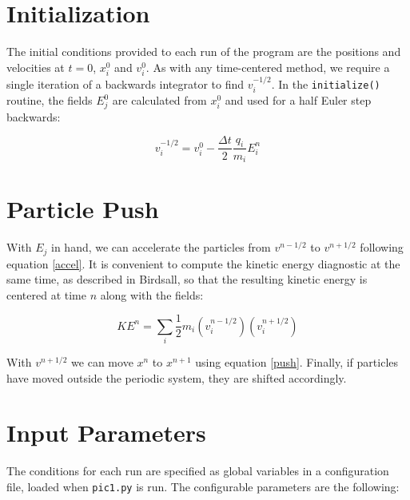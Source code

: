 \documentclass[%
 reprint,
 amsmath,amssymb,
 aps,
]{revtex4-2}
\begin{document}
\section{Initialization}

The initial conditions provided to each run of the program are the positions and velocities at $t=0$, $x_i ^0$ and $v_i ^0$. As with any time-centered method, we require a single iteration of a backwards integrator to find $v_i ^{-1/2}$. In the \texttt{initialize()} routine, the fields $E_j ^0$ are calculated from $x_i ^0$ and used for a half Euler step backwards:

\begin{equation}
v _i ^{-1/2} = v_i ^0 - \frac{\Delta t}{2} \frac{q_i}{m_i} E_i ^n
\end{equation}

\section{Particle Push}

With $E_j$ in hand, we can accelerate the particles from $v^{n - 1/2}$ to $v^{n + 1/2}$ following equation \eqref{accel}. It is convenient to compute the kinetic energy diagnostic at the same time, as described in Birdsall, so that the resulting kinetic energy is centered at time $n$ along with the fields:

\begin{equation}
KE^n = \sum_i \frac{1}{2} m_i (v_i ^{n - 1/2}) (v_i ^{n + 1/2})
\end{equation}

With $v^{n + 1/2}$ we can move $x^n$ to $x^{n+1}$ using equation \ref{push}. Finally, if particles have moved outside the periodic system, they are shifted accordingly.

\section{Input Parameters}

The conditions for each run are specified as global variables in a configuration file, loaded when \texttt{pic1.py} is run. The configurable parameters are the following:
\end{document}
